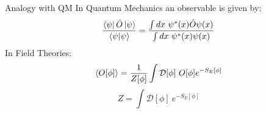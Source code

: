 \documentclass[10pt]{beamer}
\begin{document}
\begin{frame}{Analogy with QM}
	In Quantum Mechanics an observable is given by:
	\begin{equation}\nonumber
		\frac{\bra{\psi} \hat{O} \ket{\psi}   }{\braket{\psi|\psi}} = \frac{\int dx~\psi^*(x) \hat{O} \psi(x) }{\int dx~\psi^*(x) \psi(x)}
	\end{equation}
	In Field Theories:
	\begin{equation}\nonumber
		\braket{O[\phi]} = \frac{1}{Z[\phi]} \int  \mathcal{D}[\phi] ~O[\phi] e^{-S_E[\phi]}
	\end{equation}
	\begin{equation}\nonumber
		Z = \int \mathcal{D}[\phi] ~e^{-S_E[\phi]}
	\end{equation}
\end{frame}
\end{document}
